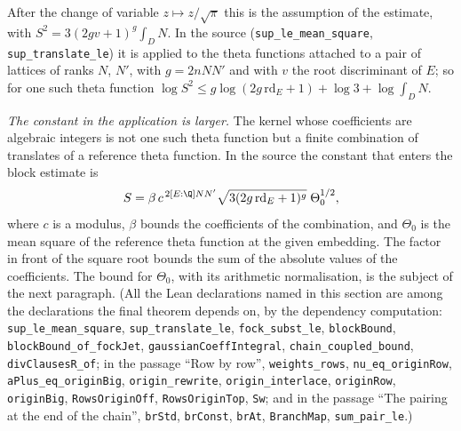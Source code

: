 \documentclass[11pt,letterpaper]{article}
\begin{document}
\noindent After the change of variable $z\mapsto z/\sqrt\pi$ this is the assumption of the estimate, with
$S^2=3(2gv+1)^g\int_DN$. In the source (\texttt{sup\_le\_mean\_square}, \texttt{sup\_translate\_le}) it is
applied to the theta functions attached to a pair of lattices of ranks $N$, $N'$, with $g=2nNN'$ and with
$v$ the root discriminant of $E$; so for one such theta function $\log S^2\le g\log(2g\,\mathrm{rd}_E+1)+\log3+\log\int_DN$.

\emph{The constant in the application is larger.} The kernel whose coefficients are algebraic integers is
not one such theta function but a finite combination of translates of a reference theta function. In the
source the constant that enters the block estimate is
\begin{equation}\label{III:Sform}
 S=\beta\,c^{\,2[E:\Q]NN'}\sqrt{3(2g\,\mathrm{rd}_E+1)^g}\;\Theta_0^{1/2},
\end{equation}
where $c$ is a modulus, $\beta$ bounds the coefficients of the combination, and $\Theta_0$ is the mean
square of the reference theta function at the given embedding. The factor in front of the square root
bounds the sum of the absolute values of the coefficients. The bound for $\Theta_0$, with its arithmetic normalisation, is the subject
of the next paragraph. (All the Lean declarations named in this section are among the declarations the final theorem depends
on, by the dependency computation: \texttt{sup\_le\_mean\_square}, \texttt{sup\_translate\_le},
\texttt{fock\_subst\_le}, \texttt{blockBound}, \texttt{blockBound\_of\_fockJet},
\texttt{gaussianCoeffIntegral}, \texttt{chain\_coupled\_bound}, \texttt{divClausesR\_of}; in the passage
``Row by row'', \texttt{weights\_rows}, \texttt{nu\_eq\_originRow}, \texttt{aPlus\_eq\_originBig},
\texttt{origin\_rewrite}, \texttt{origin\_interlace}, \texttt{originRow}, \texttt{originBig},
\texttt{RowsOriginOff}, \texttt{RowsOriginTop}, \texttt{Sw}; and in the passage ``The pairing at the end of
the chain'', \texttt{brStd}, \texttt{brConst}, \texttt{brAt}, \texttt{BranchMap}, \texttt{sum\_pair\_le}.)
\end{document}
